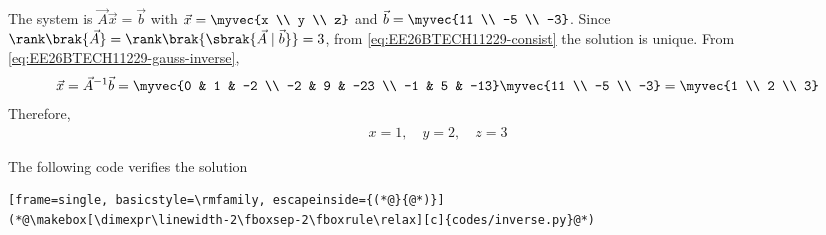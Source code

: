 \begin{enumerate}[label=\thesubsection.\arabic*, ref=\thesubsection.\theenumi]
The system is $\vec{A}\vec{x} = \vec{b}$ with $\vec{x} = \myvec{x \\ y \\ z}$ and $\vec{b} = \myvec{11 \\ -5 \\ -3}$. Since $\rank\brak{\vec{A}} = \rank\brak{\sbrak{\vec{A} \mid \vec{b}}} = 3$, from \eqref{eq:EE26BTECH11229-consist} the solution is unique. From \eqref{eq:EE26BTECH11229-gauss-inverse},
\begin{align}
	\vec{x} = \vec{A}^{-1}\vec{b} = \myvec{0 & 1 & -2 \\ -2 & 9 & -23 \\ -1 & 5 & -13}\myvec{11 \\ -5 \\ -3} = \myvec{1 \\ 2 \\ 3}
\end{align}
Therefore,
\begin{align}
	x = 1, \quad y = 2, \quad z = 3
\end{align}

The following code verifies the solution
\begin{lstlisting}[frame=single, basicstyle=\rmfamily, escapeinside={(*@}{@*)}]
(*@\makebox[\dimexpr\linewidth-2\fboxsep-2\fboxrule\relax][c]{codes/inverse.py}@*)
\end{lstlisting}
\end{enumerate}
